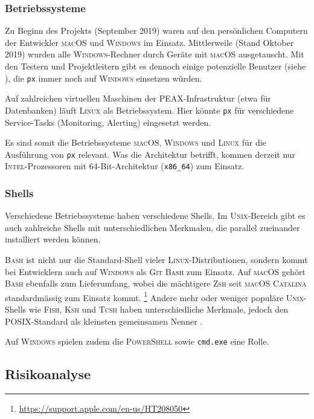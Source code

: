 \subsubsection{Betriebssysteme}

Zu Beginn des Projekts (September 2019) waren auf den persönlichen Computern der Entwickler \textsc{macOS} und \textsc{Windows} im Einsatz. Mittlerweile (Stand Oktober 2019) wurden alle \textsc{Windows}-Rechner durch Geräte mit \textsc{macOS} ausgetauscht. Mit den Testern und Projektleitern gibt es dennoch einige potenzielle Benutzer (siehe ), die \texttt{px} immer noch auf \textsc{Windows} einsetzen würden.

Auf zahlreichen virtuellen Maschinen der PEAX-Infrastruktur (etwa für Datenbanken) läuft \textsc{Linux} als Betriebssystem. Hier könnte \texttt{px} für verschiedene Service-Tasks (Monitoring, Alerting) eingesetzt werden.

Es sind somit die Betriebssysteme \textsc{macOS}, \textsc{Windows} und \textsc{Linux} für die Ausführung von \texttt{px} relevant. Was die Architektur betrifft, kommen derzeit nur \textsc{Intel}-Prozessoren mit 64-Bit-Architektur (\texttt{x86\_64}) zum Einsatz.

\subsubsection{Shells} 

Verschiedene Betriebssysteme haben verschiedene Shells. Im \textsc{Unix}-Bereich gibt es auch zahlreiche Shells mit unterschiedlichen Merkmalen, die parallel zueinander installiert werden können.

\textsc{Bash} ist nicht nur die Standard-Shell vieler \textsc{Linux}-Distributionen, sondern kommt bei Entwicklern auch auf \textsc{Windows} als \textsc{Git Bash} zum Einsatz. Auf \textsc{macOS} gehört \textsc{Bash} ebenfalls zum Lieferumfang, wobei die mächtigere \textsc{Zsh} seit \textsc{macOS Catalina} standardmässig zum Einsatz kommt. \footnote{\url{https://support.apple.com/en-us/HT208050}} Andere mehr oder weniger populäre \textsc{Unix}-Shells wie \textsc{Fish}, \textsc{Ksh} und \textsc{Tcsh} haben unterschiedliche Merkmale, jedoch den \textsc{POSIX}-Standard als kleinsten gemeinsamen Nenner \cite{posix-shell}.

Auf \textsc{Windows} spielen zudem die \textsc{PowerShell} sowie \texttt{cmd.exe} eine Rolle.

\subsection{Risikoanalyse}
\label{sec:Risikoanalyse}

